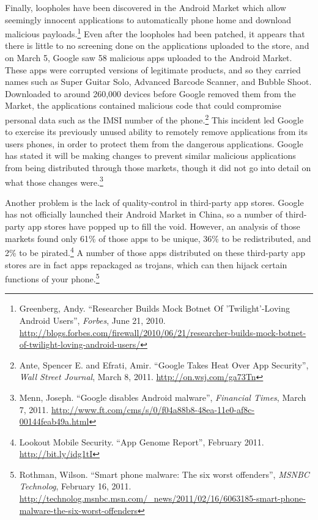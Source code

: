 \documentclass[11pt]{article}
\begin{document}
Finally, loopholes have been discovered in the Android Market which allow
seemingly innocent applications to automatically phone home and download
malicious payloads.\footnote{Greenberg, Andy. ``Researcher Builds Mock Botnet
Of 'Twilight'-Loving Android Users'', \textit{Forbes}, June 21, 2010.
\url{http://blogs.forbes.com/firewall/2010/06/21/researcher-builds-mock-botnet-of-twilight-loving-android-users/}}
Even after the loopholes had been patched, it appears that there is little to
no screening done on the applications uploaded to the store, and on March 5,
Google saw 58 malicious apps uploaded to the Android Market. These apps were
corrupted versions of legitimate products, and so they carried names such as
Super Guitar Solo, Advanced Barcode Scanner, and Bubble Shoot. Downloaded to
around 260,000 devices before Google removed them from the Market, the
applications contained malicious code that could compromise personal data such
as  the IMSI number of the phone.\footnote{Ante, Spencer E. and Efrati, Amir.
``Google Takes Heat Over App Security'', \textit{Wall Street Journal}, March 8,
2011. \url{http://on.wsj.com/ga73Tn}} This incident led Google to exercise its
previously unused ability to remotely remove applications from its users
phones, in order to protect them from the dangerous applications. Google has
stated it will be making changes to prevent similar malicious applications from
being distributed through those markets, though it did not go into detail on
what those changes were.\footnote{Menn, Joseph. ``Google disables Android
malware'', \textit{Financial Times}, March 7, 2011.
\url{http://www.ft.com/cms/s/0/f04a88b8-48ea-11e0-af8c-00144feab49a.html}}

Another problem is the lack of quality-control in third-party app stores.
Google has not officially launched their Android Market in China, so a number
of third-party app stores have popped up to fill the void. However, an analysis
of those markets found only 61\% of those apps to be unique, 36\% to be
redistributed, and 2\% to be pirated.\footnote{Lookout Mobile Security. ``App
Genome Report'', February 2011. \url{http://bit.ly/idg1tI}} A number of those
apps distributed on these third-party app stores are in fact apps repackaged as
trojans, which can then hijack certain functions of your
phone.\footnote{Rothman, Wilson. ``Smart phone malware: The six worst
offenders'', \textit{MSNBC Technolog}, February 16, 2011.
\url{http://technolog.msnbc.msn.com/_news/2011/02/16/6063185-smart-phone-malware-the-six-worst-offenders}}
\end{document}
